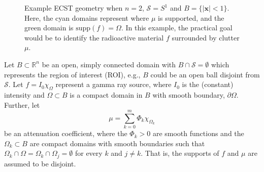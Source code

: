 \documentclass[a4paper,12pt]{amsart}
\numberwithin{equation}{section}
\theoremstyle{plain}
\numberwithin{theorem}{section}
\theoremstyle{definition}
\theoremstyle{remark}
\theoremstyle{remark}
\theoremstyle{remark}
\newcommand{\s}{\mathcal S}
\newcommand{\tred}[1]{{\color{red}#1}}
\newcommand{\vv}{{\mathbf{v}}}
\newcommand{\vx}{{\mathbf{x}}}
\newcommand\irregularcircle[2]{%
  \pgfextra {\pgfmathsetmacro\len{(#1)+rand*(#2)}}
  +(0:\len pt)
  \foreach \a in {10,20,...,350}{
    \pgfextra {\pgfmathsetmacro\len{(#1)+rand*(#2)}}
    -- +(\a:\len pt)
  } -- cycle
}
\begin{document}
\begin{figure}[!h]
\centering
{}
\caption{Example ECST geometry when $n=2$, $\s = S^{1}$ and $B = \{|\vx| < 1\}$. Here, the cyan domains represent where $\mu$ is supported, and the green domain is $\text{supp}(f) = \Omega$. In this example, the practical goal would be to identify the radioactive material $f$ surrounded by clutter $\mu$.}
\label{fig1}
\end{figure}

Let $B \subset \mathbb{R}^n$ be an open, simply connected domain with $B\cap \s = \emptyset$ which represents the region of interest (ROI), e.g., $B$ could be an open ball disjoint from $\s$. Let $f = I_0 \chi_\Omega$ represent a gamma ray source, where $I_0$ is the (constant) intensity and $\Omega \subset B$ is a compact domain in $B$ with smooth boundary, $\partial \Omega$. Further, let
\begin{equation}\label{eq:muform}
\mu = \sum_{k = 0}^m \Phi_k \chi_{\Omega_k}
\end{equation}
be an attenuation coefficient, where the $\Phi_k > 0$ are smooth functions and the $\Omega_k \subset B$ are compact domains with smooth boundaries such that $\Omega_k \cap \Omega = \Omega_k \cap \Omega_j = \emptyset$ for every $k$ and $j \neq k$. That is, the supports of $f$ and $\mu$ are assumed to be disjoint. 
\end{document}
